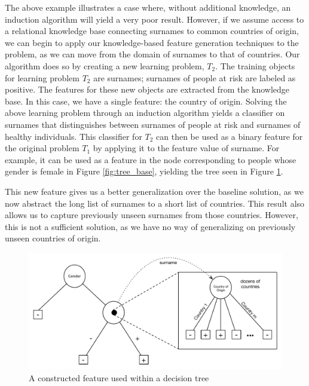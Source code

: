 \documentclass[twoside,11pt]{article}
\theoremstyle{definition}
\begin{document}
The above example illustrates a case where, without additional knowledge, an induction algorithm will yield a very poor result. %
However, if we assume access to a relational knowledge base connecting surnames to common countries of origin, we can begin to apply our knowledge-based feature generation techniques to the problem, as we can move from the domain of surnames to that of countries. 
Our algorithm does so by creating a new learning problem, $T_2$. The training objects for learning problem $T_2$ are surnames; surnames of people at risk are labeled as positive. The features for these new objects are extracted from the knowledge base. In this case, we have a single feature: the country of origin.
Solving the above learning problem through an induction algorithm yields a classifier on surnames that distinguishes between surnames of people at risk and surnames of healthy individuals. This classifier for $T_2$ can then be used as a binary feature for the original problem $T_1$ by applying it to the feature value of surname. For example, it can be used as a feature in the node corresponding to people whose gender is female in Figure \ref{fig:tree_base}, yielding the tree seen in Figure \ref{fig:lvl1_tree}. 

This new feature gives us a better generalization over the baseline solution, as we now abstract the long list of surnames to a short list of countries. %
This result also allows us to capture previously unseen surnames from those countries. However, this is not a sufficient solution, as we have no way of generalizing on previously unseen countries of origin. %


\begin{figure}[h]
	\centering
	\includegraphics[width=\linewidth]{fig2.pdf}
	\caption{A constructed feature used within a decision tree}
	\label{fig:lvl1_tree}
\end{figure}
\end{document}
